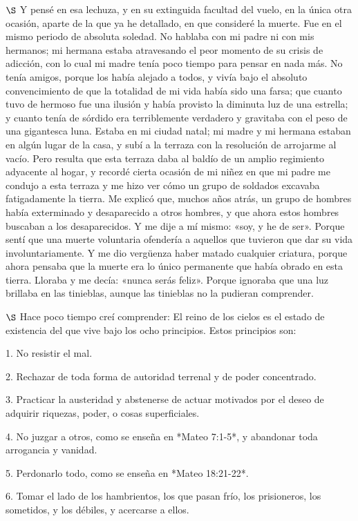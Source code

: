 \documentclass[a4paper, 12pt]{article}
\begin{document}
$\S$ Y pensé en esa lechuza, y en su extinguida facultad del vuelo, en la única
otra ocasión, aparte de la que ya he detallado, en que consideré la muerte. Fue
en el mismo periodo de absoluta soledad. No hablaba con mi padre ni con mis
hermanos; mi hermana estaba atravesando el peor momento de su crisis de
adicción, con lo cual mi madre tenía poco tiempo para pensar en nada más. No
tenía amigos, porque los había alejado a todos, y vivía bajo el absoluto
convencimiento de que la totalidad de mi vida había sido una farsa; que cuanto
tuvo de hermoso fue una ilusión y había provisto la diminuta luz de una
estrella; y cuanto tenía de sórdido era terriblemente verdadero y gravitaba con
el peso de una gigantesca luna. Estaba en mi ciudad natal; mi
madre y mi hermana estaban en algún lugar de la casa, y subí a la terraza con la
resolución de arrojarme al vacío. Pero resulta que esta terraza daba al baldío
de un amplio regimiento adyacente al hogar, y recordé cierta ocasión de mi niñez
en que mi padre me condujo a esta terraza y me hizo ver cómo un grupo de
soldados excavaba fatigadamente la tierra. Me explicó que, muchos años atrás, un
grupo de hombres había exterminado y desaparecido a otros hombres, y que ahora
estos hombres buscaban a los desaparecidos. Y me dije a mí mismo: «soy, y he de
ser». Porque sentí que una muerte voluntaria ofendería a aquellos que tuvieron
que dar su vida involuntariamente. 
Y me dio vergüenza haber matado cualquier
criatura, porque ahora pensaba que la muerte era lo único permanente que había
obrado en esta tierra.
Lloraba y me decía: «nunca serás feliz». Porque ignoraba
que una luz brillaba en las tinieblas, aunque las tinieblas no la pudieran
comprender.

\newpage 

$\S$ Hace poco tiempo creí comprender: El reino de los cielos es el estado de
existencia del que vive bajo los ocho principios. Estos principios son: 

1. No resistir el mal.

2. Rechazar de toda forma de autoridad terrenal y de poder concentrado.

3. Practicar la austeridad y abstenerse de actuar motivados por el deseo de
adquirir riquezas, poder, o cosas superficiales.

4. No juzgar a otros, como se enseña en *Mateo 7:1-5*, y abandonar toda
arrogancia y vanidad.

5. Perdonarlo todo, como se enseña en *Mateo 18:21-22*. 

6. Tomar el lado de los hambrientos, los que pasan frío, los prisioneros, los
sometidos, y los débiles, y acercarse a ellos.
\end{document}
